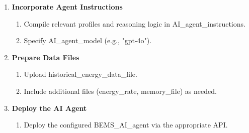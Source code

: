 \documentclass[final,3p,times]{elsarticle}
\begin{document}
\begin{algorithm}[htbp]
\begin{minipage}{0.92\linewidth}
\begin{enumerate}
\begin{enumerate}
\begin{enumerate}
          $\vdots$ \Indm
        \end{enumerate}
      \item Check if additional information is needed:

        \Indp
                if additional information is required then\;
                \Indp
                    call memory functions or request user input\;
                \Indm
                if function call valid then\;
                \Indp
                    proceed\;
                \Indm
                else\;
                \Indp
                    respond with explanation\;
                \Indm  

    \end{enumerate}

  \item \textbf{Incorporate Agent Instructions}
    \begin{enumerate}
      \item Compile relevant profiles and reasoning logic in AI\_agent\_instructions.
      \item Specify AI\_agent\_model (e.g., "gpt-4o").
    \end{enumerate}

  \item \textbf{Prepare Data Files}
    \begin{enumerate}
      \item Upload historical\_energy\_data\_file.
      \item Include additional files (energy\_rate, memory\_file) as needed.
    \end{enumerate}

  \item \textbf{Deploy the AI Agent}
    \begin{enumerate}
      \item Deploy the configured BEMS\_AI\_agent via the appropriate API.
    \end{enumerate}
\end{enumerate}
\end{minipage}
\end{algorithm}
\end{document}
